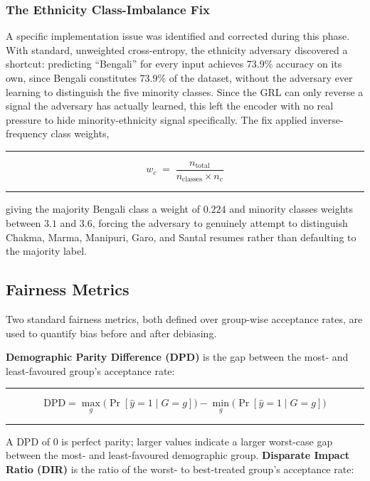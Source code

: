 \documentclass[11pt,a4paper]{article}
\newenvironment{formulabox}
  {\begin{center}\color{TPteal}\rule{0.92\linewidth}{0.8pt}\par\vspace{5pt}\color{TPnavy}}
  {\par\vspace{3pt}\color{TPteal}\rule{0.92\linewidth}{0.8pt}\end{center}}
\begin{document}
\subsubsection{The Ethnicity Class-Imbalance Fix}

A specific implementation issue was identified and corrected during this phase. With standard, unweighted cross-entropy, the ethnicity adversary discovered a shortcut: predicting ``Bengali'' for every input achieves 73.9\% accuracy on its own, since Bengali constitutes 73.9\% of the dataset, without the adversary ever learning to distinguish the five minority classes. Since the GRL can only reverse a signal the adversary has actually learned, this left the encoder with no real pressure to hide minority-ethnicity signal specifically. The fix applied inverse-frequency class weights,

\begin{formulabox}
\begin{equation}
\label{eq:classweight}
w_c \;=\; \frac{n_{\text{total}}}{n_{\text{classes}} \times n_c}
\end{equation}
\end{formulabox}

giving the majority Bengali class a weight of $0.224$ and minority classes weights between $3.1$ and $3.6$, forcing the adversary to genuinely attempt to distinguish Chakma, Marma, Manipuri, Garo, and Santal resumes rather than defaulting to the majority label.

\subsection{Fairness Metrics}
\label{sec:mod1-fairnessdef}

Two standard fairness metrics, both defined over group-wise acceptance rates, are used to quantify bias before and after debiasing.

\textbf{Demographic Parity Difference (DPD)} is the gap between the most- and least-favoured group's acceptance rate:

\begin{formulabox}
\begin{equation}
\label{eq:dpd}
\mathrm{DPD} = \max_g \big(\Pr[\hat{y}=1 \mid G=g]\big) - \min_g \big(\Pr[\hat{y}=1 \mid G=g]\big)
\end{equation}
\end{formulabox}

A DPD of 0 is perfect parity; larger values indicate a larger worst-case gap between the most- and least-favoured demographic group. \textbf{Disparate Impact Ratio (DIR)} is the ratio of the worst- to best-treated group's acceptance rate:
\end{document}

